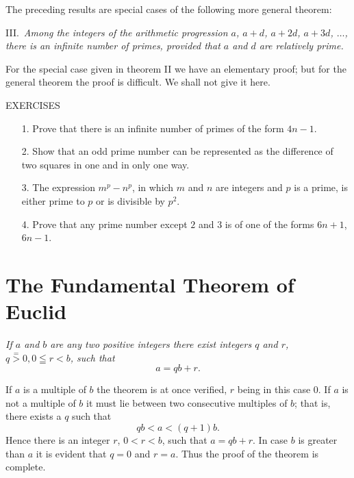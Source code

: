 \documentclass[oneside]{book}
\begin{document}
The preceding results are special cases of the following more
general theorem:

\smallskip III.~\emph{Among the integers of the arithmetic
progression $a$, $a + d$, $a + 2d$, $a + 3d$, $\ldots$, there is an
infinite number of
primes, provided that $a$ and $d$ are relatively prime.}%

For the special case given in theorem II we have an elementary
proof; but for the general theorem the proof is difficult. We shall
not give it here.

\begin{center}
EXERCISES
\end{center}

\small \begin{enumerate}

\item[1.] Prove that there is an infinite number of primes of the
form $4n - 1$.

\item[2.] Show that an odd prime number can be represented as the
difference of two squares in one and in only one way.

\item[3.] The expression $m^p - n^p$, in which $m$ and $n$ are integers
and $p$ is a prime, is either prime to $p$ or is divisible by $p^2$.

\item[4.] Prove that any prime number except $2$ and $3$ is of one of
the forms $6n + 1$, $6n - 1$.
\end{enumerate}\normalsize

\section{The Fundamental Theorem of Euclid}\label{s5}%

\emph{If $a$ and $b$ are any two positive integers there exist
integers $q$ and $r$, $q\stackrel{=}{>} 0, 0 \leqq r < b$, such
that}
\begin{equation*}
a = qb + r.
\end{equation*}

If $a$ is a multiple of $b$ the theorem is at once verified, $r$
being in this case $0$. If $a$ is not a multiple of $b$ it must lie
between two consecutive multiples of $b$; that is, there exists a
$q$ such that
\begin{equation*}
qb < a < (q + 1)b.
\end{equation*}
Hence there is an integer $r$, $0 < r < b$, such that $a = qb + r$.
In case $b$ is greater than $a$ it is evident that $q = 0$ and $r =
a$. Thus the proof of the theorem is complete.
\end{document}
